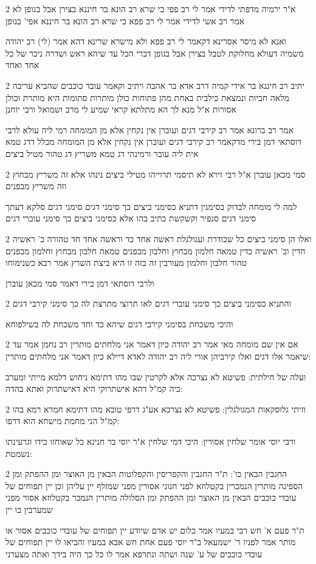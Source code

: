 \documentclass[12pt, openany]{book}
\newcommand{\sethebfont}{
\fontsize{10.5pt}{21.0pt} \selectfont
}
\newcommand{\twocol}[1]{
	{\sethebfont \begin{multicols}{2}
			#1
	\end{multicols}}	
}
\begin{document}
\twocol{א"ר ירמיה מדפתי לדידי אמר לי רב פפי כי שרא רב הונא בר חיננא בצירן אבל בגופן לא אמר רב אשי לדידי אמר לי רב פפא כי שרא רב הונא בר חיננא אפי' בגופן
\par ואנא לא מיסר אסרינא דקאמר לי רב פפא ולא מישרא שרינא דהא אמר (לי) רב יהודה משמיה דעולא מחלוקת לטבל בצירן אבל בגופן דברי הכל עד שיהא ראש ושדרה ניכר של כל אחד ואחד}
\twocol{יתיב רב חיננא בר אידי קמיה דרב אדא בר אהבה ויתיב וקאמר עובד כוכבים שהביא עריבה מלאה חביות ונמצאת כילבית באחת מהן פתוחות כולן מותרות סתומות היא מותרת וכולן אסורות א"ל מנא לך הא מתלתא קראי שמיע לי מרב ושמואל ורבי יוחנן
\par אמר רב ברונא אמר רב קירבי דגים ועוברן אין נקחין אלא מן המומחה רמי ליה עולא לרבי דוסתאי דמן בירי מדקאמר רב קירבי דגים ועוברן אין נקחין אלא מן המומחה מכלל דדג טמא אית ליה עובר ורמינהי דג טמא משריץ דג טהור מטיל ביצים}
\twocol{סמי מכאן עוברן א"ל רבי זירא לא תיסמי תרוייהו מטילי ביצים נינהו אלא זה משריץ מבחוץ וזה משריץ מבפנים
\par למה לי מומחה לבדוק בסימנין דתניא כסימני ביצים כך סימני דגים סימני דגים סלקא דעתך סימני דגים סנפיר וקשקשת כתיב בהו אלא כסימני ביצים כך סימני עוברי דגים}
\twocol{ואלו הן סימני ביצים כל שכודרת ועגולגלת ראשה אחד כד וראשה אחד חד טהורה ב' ראשיה חדין וב' ראשיה כדין טמאה חלמון מבחוץ וחלבון מבפנים טמאה חלבון מבחוץ וחלמון מבפנים טהור חלבון וחלמון מעורבין זה בזה זו היא ביצת השרץ אמר רבא כשנימוחו
\par ולרבי דוסתאי דמן בירי דאמר סמי מכאן עוברן}
\twocol{והתניא כסימני ביצים כך סימני עוברי דגים לאו תרוצי מתרצת לה כך סימני קירבי דגים
\par והיכי משכחת בסימני קירבי דגים שיהא כד וחד משכחת לה בשילפוחא}
\twocol{אם אין שם מומחה מאי אמר רב יהודה כיון דאמר אני מלחתים מותרין רב נחמן אמר עד שיאמר אלו דגים ואלו קירביהן אורי ליה רב יהודה לאדא דיילא כיון דאמר אני מלחתים מותרין:
\par ועלה של חילתית: פשיטא לא נצרכה אלא לקרטין שבו מהו דתימא ניחוש דלמא מייתי ומערב ביה קמ"ל דהא אישתרוקי היא דאישתרוק ואתא בהדה:}
\twocol{וזיתי גלוסקאות המגולגלין: פשיטא לא נצרכא אע"ג דרפי טובא מהו דתימא חמרא רמא בהו קמ"ל הני מחמת מישחא הוא דרפו:
\par ורבי יוסי אומר שלחין אסורין: היכי דמי שלחין א"ר יוסי בר חנינא כל שאוחזו בידו וגרעינתו נשמטת:}
\twocol{החגבין הבאין כו': ת"ר החגבין והקפריסין והקפלוטות הבאין מן האוצר ומן ההפתק ומן הספינה מותרין הנמכרין בקטלוזא לפני חנוני אסורין מפני שמזלף יין עליהן וכן יין תפוחים של עובדי כוכבים הבאין מן האוצר ומן ההפתק ומן הסלולה מותרין הנמכר בקטלוזא אסור מפני שמערבין בו יין
\par ת"ר פעם א' חש רבי במעיו אמר כלום יש אדם שיודע יין תפוחים של עובדי כוכבים אסור או מותר אמר לפניו ר' ישמעאל ב"ר יוסי פעם אחת חש אבא במעיו והביאו לו יין תפוחים של עובדי כוכבים של ע' שנה ושתה ונתרפא אמר לו כל כך היה בידך ואתה מצערני}
\end{document}
